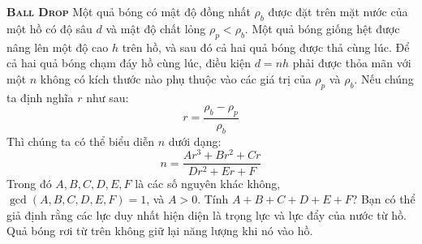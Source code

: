 \begin{problem}
{\textbf{\textsc{Ball Drop}}} Một quả bóng có mật độ đồng nhất \( \rho_b \) được đặt trên mặt nước của một hồ có độ sâu \( d \) và mật độ chất lỏng \( \rho_p < \rho_b \). Một quả bóng giống hệt được nâng lên một độ cao \( h \) trên hồ, và sau đó cả hai quả bóng được thả cùng lúc. Để cả hai quả bóng chạm đáy hồ cùng lúc, điều kiện \( d = nh \) phải được thỏa mãn với một \( n \) không có kích thước nào phụ thuộc vào các giá trị của \( \rho_p \) và \( \rho_b \). Nếu chúng ta định nghĩa \( r \) như sau:
$$r = \frac{\rho_b - \rho_p}{\rho_b}$$
Thì chúng ta có thể biểu diễn \( n \) dưới dạng:
$$n = \frac{Ar^3 + Br^2 + Cr}{Dr^2+Er+F}$$
Trong đó $A, B, C, D, E, F$ là các số nguyên khác không, $\gcd(A,B,C,D,E,F) = 1$, và $A>0$. Tính $A + B + C + D + E + F$?
Bạn có thể giả định rằng các lực duy nhất hiện diện là trọng lực và lực đẩy của nước từ hồ. Quả bóng rơi từ trên không giữ lại năng lượng khi nó vào hồ.
\end{problem}